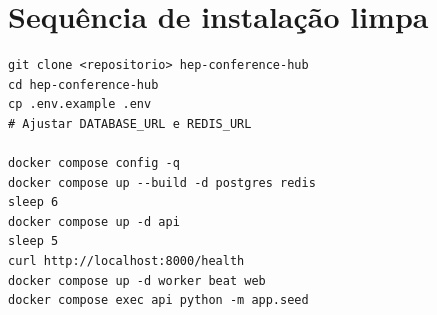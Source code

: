 \chapter{Sequência de instalação limpa}

\begin{lstlisting}
git clone <repositorio> hep-conference-hub
cd hep-conference-hub
cp .env.example .env
# Ajustar DATABASE_URL e REDIS_URL

docker compose config -q
docker compose up --build -d postgres redis
sleep 6
docker compose up -d api
sleep 5
curl http://localhost:8000/health
docker compose up -d worker beat web
docker compose exec api python -m app.seed
\end{lstlisting}
